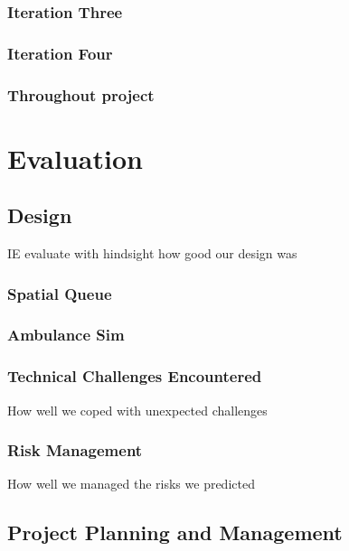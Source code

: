 \documentclass[a4paper]{article}
\begin{document}
\subsubsection{Iteration Three}

\subsubsection{Iteration Four}

\subsubsection{Throughout project}

\section{Evaluation}

\subsection{Design}%
IE evaluate with hindsight how good our design was

\subsubsection{Spatial Queue}

\subsubsection{Ambulance Sim}

\subsubsection{Technical Challenges Encountered}
How well we coped with unexpected challenges

\subsubsection{Risk Management}
How well we managed the risks we predicted

\subsection{Project Planning and Management}%
\end{document}
